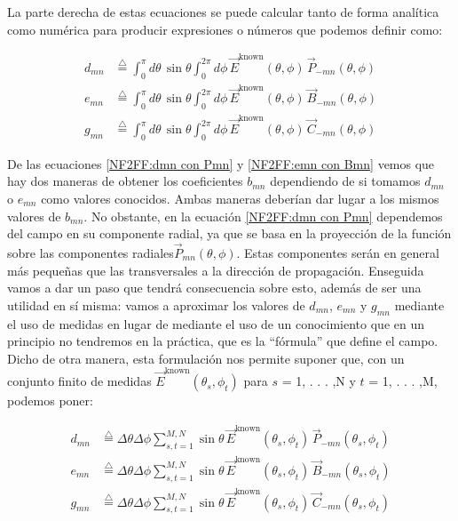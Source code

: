 La parte derecha de estas ecuaciones se puede calcular tanto de forma analítica como numérica para producir expresiones o números que podemos definir como:

\begin{align}
d_{mn} &\overset{\triangle}{=} \int_{0}^{\pi} d\theta \, \sin \theta \int_{0}^{2\pi} d\phi \, \vec{E}^{\text{known}}(\theta, \phi) \, \vec{P}_{-mn}(\theta, \phi)\label{NF2FF:dmn con Pmn} \\
e_{mn} &\overset{\triangle}{=} \int_{0}^{\pi} d\theta \, \sin \theta \int_{0}^{2\pi} d\phi \, \vec{E}^{\text{known}}(\theta, \phi) \, \vec{B}_{-mn}(\theta, \phi) \label{NF2FF:emn con Bmn} \\
g_{mn} &\overset{\triangle}{=} \int_{0}^{\pi} d\theta \, \sin \theta \int_{0}^{2\pi} d\phi \, \vec{E}^{\text{known}}(\theta, \phi) \, \vec{C}_{-mn}(\theta, \phi) \label{NF2FF:gmn con Cmn}
\end{align}

De las ecuaciones \eqref{NF2FF:dmn con Pmn} y \eqref{NF2FF:emn con Bmn} vemos que hay dos maneras de obtener los coeficientes $b_{mn}$ dependiendo de si tomamos $d_{mn}$ o $e_{mn}$ como valores conocidos. Ambas maneras deberían dar lugar a los mismos valores de $b_{mn}$. No obstante, en la ecuación \eqref{NF2FF:dmn con Pmn} dependemos del campo en su componente radial, ya que se basa en la proyección de la función sobre las componentes radiales$\vec{P}_{mn}(\theta, \phi)$. Estas componentes serán en general más pequeñas que las transversales a la dirección de propagación. Enseguida vamos a dar un paso que tendrá consecuencia sobre esto, además de ser una utilidad en sí misma: vamos a aproximar los valores de $d_{mn}$, $e_{mn}$ y $g_{mn}$ mediante el uso de medidas en lugar de mediante el uso de un conocimiento que en un principio no tendremos en la práctica, que es la “fórmula” que define el campo. Dicho de otra manera, esta formulación nos permite suponer que, con un conjunto finito de medidas $\vec{E}^{\text{known}}(\theta_{s}, \phi_{t})$ para $s$ = 1, . . . ,N y $t$ = 1, . . . ,M, podemos poner:

\begin{align}
d_{mn} &\overset{\triangle}{=} \Delta\theta \Delta\phi \sum_{s,t=1}^{M,N}  \sin \theta \, \vec{E}^{\text{known}}(\theta_s, \phi_t) \, \vec{P}_{-mn}(\theta_s, \phi_t)\label{NF2FF:dmn con Sumatorios} \\
e_{mn} &\overset{\triangle}{=} \Delta\theta \Delta\phi \sum_{s,t=1}^{M,N}  \sin \theta \, \vec{E}^{\text{known}}(\theta_s, \phi_t) \, \vec{B}_{-mn}(\theta_s, \phi_t)\label{NF2FF:emn con Sumatorios} \\
g_{mn} &\overset{\triangle}{=} \Delta\theta \Delta\phi \sum_{s,t=1}^{M,N}  \sin \theta \, \vec{E}^{\text{known}}(\theta_s, \phi_t) \, \vec{C}_{-mn}(\theta_s, \phi_t)\label{NF2FF:gmn con Sumatorios}
\end{align}

